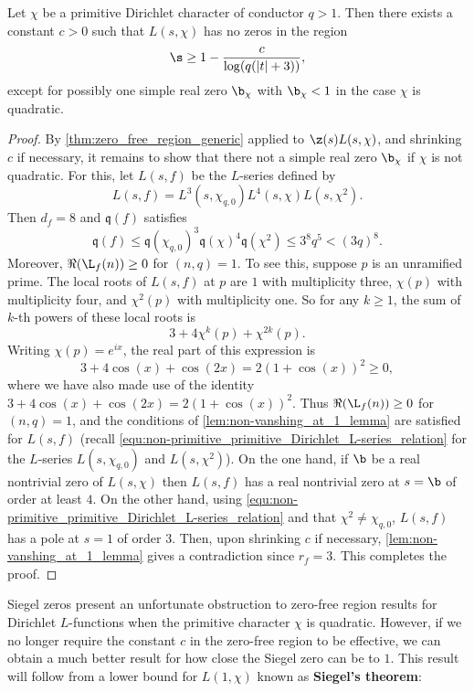     \begin{theorem}\label{thm:improved_zero-free_region_Dirichlet}
      Let \(\chi\) be a primitive Dirichlet character of conductor \(q > 1\). Then there exists a constant \(c > 0\) such that \(L(s,\chi)\) has no zeros in the region
      \[
        \s \ge 1-\frac{c}{\log(q(|t|+3))},
      \]
      except for possibly one simple real zero \(\b_{\chi}\) with \(\b_{\chi} < 1\) in the case \(\chi\) is quadratic.
    \end{theorem}
    \begin{proof}
      By \cref{thm:zero_free_region_generic} applied to \(\z(s)L(s,\chi)\), and shrinking \(c\) if necessary, it remains to show that there not a simple real zero \(\b_{\chi}\) if \(\chi\) is not quadratic. For this, let \(L(s,f)\) be the \(L\)-series defined by
      \[
        L(s,f) = L^{3}(s,\chi_{q,0})L^{4}(s,\chi)L(s,\chi^{2}).
      \]
      Then \(d_{f} = 8\) and \(\mathfrak{q}(f)\) satisfies
      \[
        \mathfrak{q}(f) \le \mathfrak{q}(\chi_{q,0})^{3}\mathfrak{q}(\chi)^{4}\mathfrak{q}(\chi^{2}) \le 3^{8}q^{5} < (3q)^{8}.
      \]
      Moreover, \(\Re(\L_{f}(n)) \ge 0\) for \((n,q) = 1\). To see this, suppose \(p\) is an unramified prime. The local roots of \(L(s,f)\) at \(p\) are \(1\) with multiplicity three, \(\chi(p)\) with multiplicity four, and \(\chi^{2}(p)\) with multiplicity one. So for any \(k \ge 1\), the sum of \(k\)-th powers of these local roots is
      \[
        3+4\chi^{k}(p)+\chi^{2k}(p).
      \]
      Writing \(\chi(p) = e^{ix}\), the real part of this expression is
      \[
        3+4\cos(x)+\cos(2x) = 2(1+\cos(x))^{2} \ge 0,
      \]
      where we have also made use of the identity \(3+4\cos(x)+\cos(2x) = 2(1+\cos(x))^{2}\). Thus \(\Re(\L_{f}(n)) \ge 0\) for \((n,q) = 1\), and the conditions of \cref{lem:non-vanshing_at_1_lemma} are satisfied for \(L(s,f)\) (recall \cref{equ:non-primitive_primitive_Dirichlet_L-series_relation} for the \(L\)-series \(L(s,\chi_{q,0})\) and \(L(s,\chi^{2})\)). On the one hand, if \(\b\) be a real nontrivial zero of \(L(s,\chi)\) then \(L(s,f)\) has a real nontrivial zero at \(s = \b\) of order at least \(4\). On the other hand, using \cref{equ:non-primitive_primitive_Dirichlet_L-series_relation} and that \(\chi^{2} \neq \chi_{q,0}\), \(L(s,f)\) has a pole at \(s = 1\) of order \(3\). Then, upon shrinking \(c\) if necessary, \cref{lem:non-vanshing_at_1_lemma} gives a contradiction since \(r_{f} = 3\). This completes the proof.
    \end{proof}

    Siegel zeros present an unfortunate obstruction to zero-free region results for Dirichlet \(L\)-functions when the primitive character \(\chi\) is quadratic. However, if we no longer require the constant \(c\) in the zero-free region to be effective, we can obtain a much better result for how close the Siegel zero can be to \(1\). This result will follow from a lower bound for \(L(1,\chi)\) known as \textbf{Siegel's theorem}:

